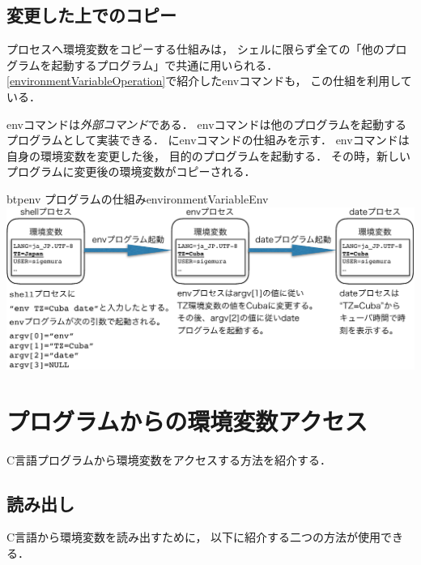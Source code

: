 \subsection{変更した上でのコピー}
プロセスへ環境変数をコピーする仕組みは，
シェルに限らず全ての「他のプログラムを起動するプログラム」で共通に用いられる．
\ref{environmentVariableOperation}で紹介したenvコマンドも，
この仕組を利用している．

envコマンドは\emph{外部コマンド}である．
envコマンドは他のプログラムを起動するプログラムとして実装できる．
にenvコマンドの仕組みを示す．
envコマンドは自身の環境変数を変更した後，
目的のプログラムを起動する．
その時，新しいプログラムに変更後の環境変数がコピーされる．

\begin{myfig}{btp}{env プログラムの仕組み}{environmentVariableEnv}
  \includegraphics[scale=0.8]{Fig/environmentVariableEnv-crop.pdf}
\end{myfig}

\section{プログラムからの環境変数アクセス}
C言語プログラムから環境変数をアクセスする方法を紹介する．

\subsection{読み出し}
C言語から環境変数を読み出すために，
以下に紹介する二つの方法が使用できる．

